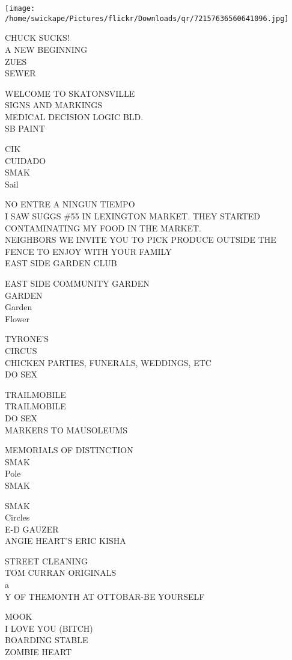 \documentclass[10pt,letterpaper]{article}
\begin{document}
\texttt{[image: /home/swickape/Pictures/flickr/Downloads/qr/72157636560641096.jpg]}


CHUCK SUCKS!\\
A NEW BEGINNING\\
ZUES\\
SEWER

WELCOME TO SKATONSVILLE\\
SIGNS AND MARKINGS\\
MEDICAL DECISION LOGIC BLD.\\
SB PAINT

CIK\\
CUIDADO\\
SMAK\\
Sail

NO ENTRE A NINGUN TIEMPO\\
I SAW SUGGS \#55 IN LEXINGTON MARKET.  THEY STARTED CONTAMINATING MY FOOD IN THE MARKET.\\
NEIGHBORS WE INVITE YOU TO PICK PRODUCE OUTSIDE THE FENCE TO ENJOY WITH YOUR FAMILY\\
EAST SIDE GARDEN CLUB

EAST SIDE COMMUNITY GARDEN\\
GARDEN\\
Garden\\
Flower

TYRONE'S\\
CIRCUS\\
CHICKEN PARTIES, FUNERALS, WEDDINGS, ETC\\
DO SEX

TRAILMOBILE\\
TRAILMOBILE\\
DO SEX\\
MARKERS TO MAUSOLEUMS

MEMORIALS OF DISTINCTION\\
SMAK\\
Pole\\
SMAK

SMAK\\
Circles\\
E{-}D GAUZER\\
ANGIE HEART'S ERIC KISHA

STREET CLEANING\\
TOM CURRAN ORIGINALS\\
a\\
Y OF THEMONTH AT OTTOBAR{-}BE YOURSELF

MOOK\\
I LOVE YOU (BITCH)\\
BOARDING STABLE\\
ZOMBIE HEART
\end{document}
